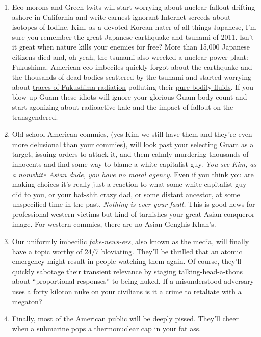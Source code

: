 \begin{enumerate}
\def\labelenumi{\arabic{enumi}.}
\item
  Eco-morons and Green-twits will start worrying about nuclear fallout
  drifting ashore in California and write earnest ignorant Internet
  screeds about isotopes of Iodine. Kim, as a devoted Korean hater of
  all things Japanese, I'm sure you remember the great Japanese
  earthquake and tsunami of 2011. Isn't it great when nature kills your
  enemies for free? More than 15,000 Japanese citizens died and, oh
  yeah, the tsunami also wrecked a nuclear power plant: Fukushima.
  American eco-imbeciles quickly forgot about the earthquake and the
  thousands of dead bodies scattered by the tsunami and started worrying
  about
  \href{https://www.forbes.com/sites/timworstall/2013/11/16/fukushima-radiation-in-pacific-tuna-is-equal-to-one-twentieth-of-a-banana/\#3b3cfee6fe61}{traces
  of Fukushima radiation} polluting their
  \href{https://www.youtube.com/watch?v=N1KvgtEnABY}{pure bodily
  fluids}. If you blow up Guam these idiots will ignore your glorious
  Guam body count and start agonizing about radioactive kale and the
  impact of fallout on the transgendered.
\item
  Old school American commies, (yes Kim we still have them and they're
  even more delusional than your commies), will look past your selecting
  Guam as a target, issuing orders to attack it, and them calmly
  murdering thousands of innocents and find some way to blame a white
  capitalist guy. \emph{You see Kim, as a nonwhite Asian dude, you have
  no moral agency}. Even if you think you are making choices it's really
  just a reaction to what some white capitalist guy did to you, or your
  bat-shit crazy dad, or some distant ancestor, at some unspecified time
  in the past. \emph{Nothing is ever your fault.} This is good news for
  professional western victims but kind of tarnishes your great Asian
  conqueror image. For western commies, there are no Asian Genghis
  Khan's.
\item
  Our uniformly imbecilic \emph{fake-news-ers}, also known as the media,
  will finally have a topic worthy of 24/7 bloviating. They'll be
  thrilled that an atomic emergency might result in people watching them
  again. Of course, they'll quickly sabotage their transient relevance
  by staging talking-head-a-thons about ``proportional responses'' to
  being nuked. If a misunderstood adversary uses a forty kiloton nuke on
  your civilians is it a crime to retaliate with a megaton?
\item
  Finally, most of the American public will be deeply pissed. They'll
  cheer when a submarine pops a thermonuclear cap in your fat ass.
\end{enumerate}

